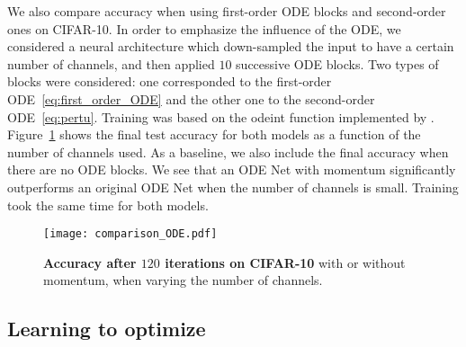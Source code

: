 \documentclass{article}
\begin{document}
We also compare accuracy when using first-order ODE blocks \citep{chen2018neural} and second-order ones on CIFAR-10. In order to emphasize the influence of the ODE, we considered a neural architecture which down-sampled the input to have a certain number of channels, and then applied $10$ successive ODE blocks. Two types of blocks were considered: one corresponded to the first-order ODE~\eqref{eq:first_order_ODE} and the other one to the second-order ODE~\eqref{eq:pertu}. Training was based on the odeint function implemented by \citet{chen2018neural}.
Figure~\ref{fig:continuous_CIFAR_10} shows the final test accuracy for both models as a function of the number of channels used. As a baseline, we also include the final accuracy when there are no ODE blocks. We see that an ODE Net with momentum significantly outperforms an original ODE Net when the number of channels is small. Training took the same time for both models. 
\begin{figure}[ht]
\begin{minipage}[c]{0.6\linewidth}
        \texttt{[image: comparison\_ODE.pdf]}
    \end{minipage}\hfill
    \begin{minipage}[c]{0.35\linewidth}
        \vspace{-1em}
    \caption{\textbf{Accuracy after $120$ iterations on CIFAR-10} with or without momentum, when varying the number of channels.}\label{fig:continuous_CIFAR_10}
    \end{minipage}
    \vspace{-1em}
\end{figure} 









\subsection{Learning to optimize}
\label{sec-numerics-lista}
\end{document}

